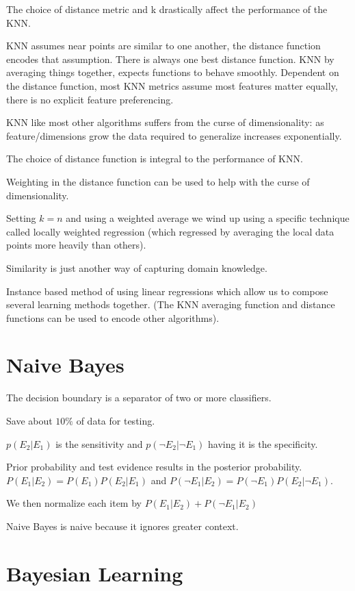 \documentclass{article}
\begin{document}
The choice of distance metric and k drastically affect the performance of the 
KNN. 

KNN assumes near points are similar to one another, the distance function
encodes that assumption. There is always one best distance function. KNN by 
averaging things together, expects functions to behave smoothly. Dependent on
the distance function, most KNN metrics assume most features matter equally,
there is no explicit feature preferencing. 

KNN like most other algorithms suffers from the curse of dimensionality:
as feature/dimensions grow the data required to generalize increases
exponentially. 

The choice of distance function is integral to the performance of KNN. 

Weighting  in the distance function can be used to help with the curse of 
dimensionality. 

Setting $k=n$ and using a weighted average we wind up using a specific 
technique called locally weighted regression (which regressed by averaging the 
local data points more heavily than others).  

Similarity is just another way of capturing domain knowledge. 

Instance based method of using linear regressions which allow us to compose
several learning methods together. (The KNN averaging function and distance 
functions can be used to encode other algorithms). 

\section{Naive Bayes}

The decision boundary is a separator of two or more classifiers. 

Save about $10\%$ of data for testing.

$p(E_2 \vert E_1)$ is the sensitivity and $p(\neg E_2 \vert \neg E_1)$ having it is the specificity. 

Prior probability and test evidence results in the posterior probability. 
$P(E_1\vert E_2) = P(E_1) P(E_2 \vert E_1)$ and $P(\neg E_1 \vert E_2) = 
P(\neg E_1) P(E_2 \vert \neg E_1)$.

We then normalize each item by $P(E_1\vert E_2) + P(\neg E_1 \vert E_2)$

Naive Bayes is naive because it ignores greater context.

\section{Bayesian Learning}
\end{document}
